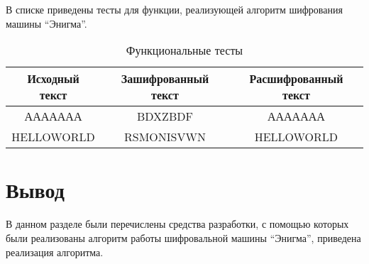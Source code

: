 В списке приведены тесты для функции, реализующей алгоритм шифрования машины ``Энигма''.

\begin{table}[H]
	\begin{center}
		\caption{\label{tbl:test} Функциональные тесты}
		\begin{tabular}{|c|c|c|}
			\hline
			Исходный текст&Зашифрованный текст&Расшифрованный текст \\
			\hline
			ААААААА&BDXZBDF&ААААААА \\
			\hline
			HELLOWORLD&RSMONISVWN&HELLOWORLD\\
			\hline
		\end{tabular}
	\end{center}
\end{table}

\section*{Вывод}
В данном разделе были перечислены средства разработки, с помощью которых были реализованы алгоритм работы шифровальной машины ``Энигма'', приведена реализация алгоритма.


